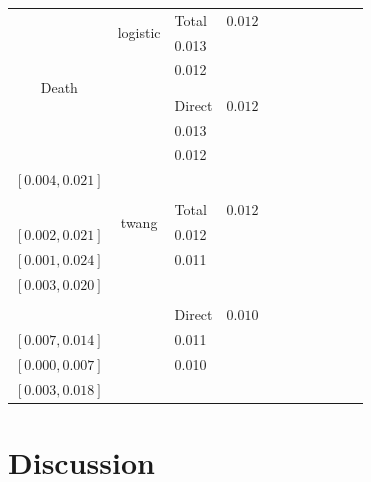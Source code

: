 \documentclass[11pt]{article}
\begin{document}
\begin{table}[h]
\begin{center}
\begin{tabular}{ccl cc c cr c cc}
\hline
\multirow{8}{*}{Death}
&\multirow{2}{*}{logistic}
& Total  
& $0.012$ & \Centerstack[c]{$[0.005,0.020]$\\ $[0.005,0.020]$}&& 0.013 &  \Centerstack[c]{$[0.004,0.022]$ \\ $[0.005,0.021]$} && 0.012 &  \Centerstack[c]{$[0.005,0.019]$ \\ $[0.006,0.018]$ }
\tabularnewline
\\[-1.5ex] 

&
&Direct  
& $0.012$ & \Centerstack[c]{$[0.005,0.020]$\\ $[0.005,0.022]$}&& 0.013 &  \Centerstack[c]{$[0.004,0.022]$ \\ $[0.004,0.023]$} && 0.012 &  \Centerstack[c]{$[0.005,0.019]$ \\ $[0.004,0.021]$}
\tabularnewline

\\%

&\multirow{2}{*}{twang}
& Total 
&$0.012$ &  \Centerstack{$[0.004,0.020]$\\ $[0.002,0.021]$}&& 0.012 &  \Centerstack{$[0.003,0.022]$ \\ $[0.001,0.024]$} && 0.011 &  \Centerstack{$[0.004,0.019]$ \\ $[0.003,0.020]$}
\tabularnewline
\\[-1.5ex] 

&
& Direct 
&$0.010$ &  \Centerstack{$[0.003,0.018]$\\ $[0.007,0.014]$}&& 0.011 &  \Centerstack{$[0.002,0.020]$ \\ $[0.000,0.007]$} && 0.010 &  \Centerstack{$[0.003,0.018]$ \\ $[0.003,0.018]$}\\
\hline
\end{tabular}
\end{center}
\end{table}






\section{Discussion}


\end{document}
